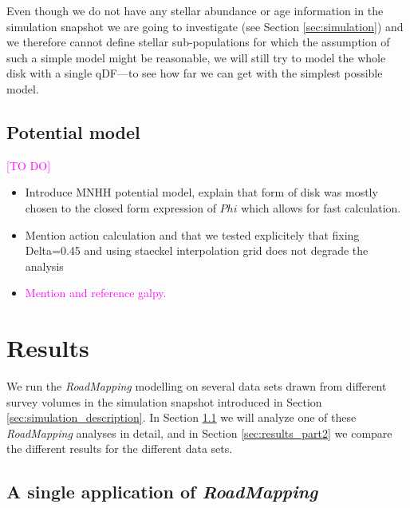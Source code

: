 \documentclass[iop,revtex4,numberedappendix,appendixfloats]{emulateapj}
\newcommand{\RM}{{\sl RoadMapping}}
\newcommand{\Wilma}[1]{\textcolor{Magenta}{#1}}
\begin{document}
Even though we do not have any stellar abundance or age information in the simulation snapshot we are going to investigate (see Section \ref{sec:simulation}) and we therefore cannot define stellar sub-populations for which the assumption of such a simple model might be reasonable, we will still try to model the whole disk with a single qDF---to see how far we can get with the simplest possible model.

\subsection{Potential model} \label{sec:potential_model}

\Wilma{[TO DO]}

\begin{itemize}
\item Introduce MNHH potential model, explain that form of disk was mostly chosen to the closed form expression of $Phi$ which allows for fast calculation. 
\item Mention action calculation and that we tested explicitely that fixing Delta=0.45 and using staeckel interpolation grid does not degrade the analysis
\item \Wilma{Mention and reference galpy.}
\end{itemize}

\section{Results}

We run the \RM{} modelling on several data sets drawn from different survey volumes in the simulation snapshot introduced in Section \ref{sec:simulation_description}. In Section \ref{sec:results_part1} we will analyze one of these \RM{} analyses in detail, and in Section \ref{sec:results_part2} we compare the different results for the different data sets.

\subsection{A single application of \RM{}} \label{sec:results_part1}
\end{document}
